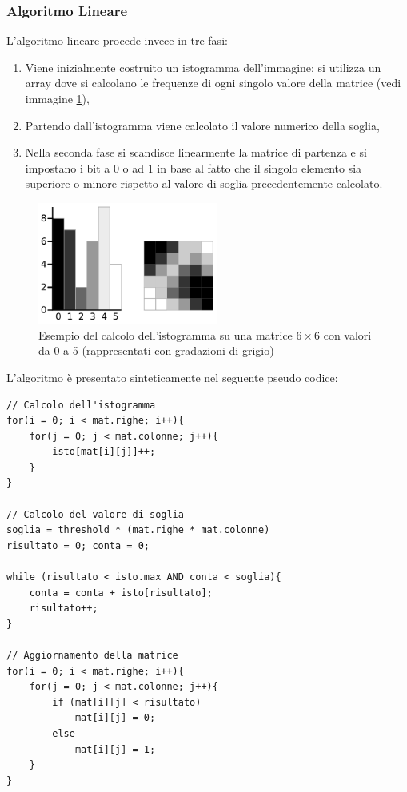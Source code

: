\documentclass[a4paper,10pt]{article}
\begin{document}
\subsubsection{Algoritmo Lineare}

L'algoritmo lineare procede invece in tre fasi:
\begin{enumerate}
\item Viene inizialmente costruito un istogramma dell'immagine: si utilizza un array dove si calcolano le frequenze di ogni singolo valore della matrice (vedi immagine \ref{img:histogram}),
\item Partendo dall'istogramma viene calcolato il valore numerico della soglia,
\item Nella seconda fase si scandisce linearmente la matrice di partenza e si impostano i bit a 0 o ad 1 in base al fatto che il singolo elemento sia superiore o minore rispetto al valore di soglia precedentemente calcolato.
\end{enumerate}

\begin{figure}[ht]
\centering
\includegraphics[height=4cm]{histo.png}
\caption{Esempio del calcolo dell'istogramma su una matrice $6 \times 6$ con valori da 0 a 5 (rappresentati con gradazioni di grigio)}
\label{img:histogram}
\end{figure}

L'algoritmo \`e presentato sinteticamente nel seguente pseudo codice:

\begin{lstlisting}[backgroundcolor=\color{White}, caption={Pseudo codice dell'algoritmo lineare}]
// Calcolo dell'istogramma
for(i = 0; i < mat.righe; i++){
	for(j = 0; j < mat.colonne; j++){
		isto[mat[i][j]]++;
	}
}

// Calcolo del valore di soglia
soglia = threshold * (mat.righe * mat.colonne)
risultato = 0; conta = 0;

while (risultato < isto.max AND conta < soglia){
	conta = conta + isto[risultato];
	risultato++;		
}

// Aggiornamento della matrice
for(i = 0; i < mat.righe; i++){
	for(j = 0; j < mat.colonne; j++){
		if (mat[i][j] < risultato)
			mat[i][j] = 0;
		else
			mat[i][j] = 1;
	}
}
\end{lstlisting}
\end{document}
